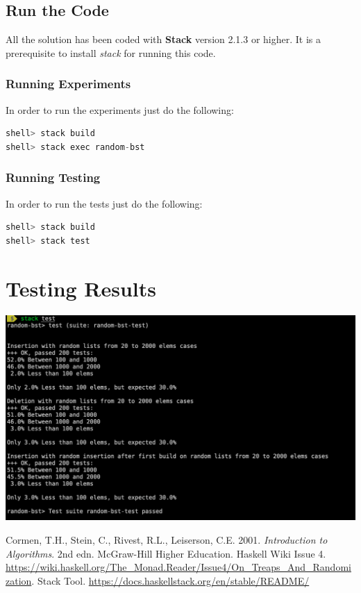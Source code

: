 \documentclass[12pt, a4paper]{article}
\begin{document}
\subsection{Run the Code}
All the solution has been coded with \textbf{Stack} \cite{stack} version 2.1.3 or higher. It is a prerequisite to install \textit{stack} for running this code.

\subsubsection{Running Experiments}

In order to run the experiments just do the following:

\begin{lstlisting}[language=Haskell,title={Running Experiments}]
shell> stack build
shell> stack exec random-bst
\end{lstlisting}


\subsubsection{Running Testing}

In order to run the tests just do the following:

\begin{lstlisting}[language=Haskell,title={Running Experiments}]
shell> stack build
shell> stack test
\end{lstlisting}

\section{Testing Results}


  \begin{minipage}[t]{\linewidth}
    \includegraphics[width=\textwidth]{tests}
    \label{fig:test_result}
  \end{minipage}


\printglossary[type=\acronymtype]

\begin{thebibliography}{9}
  Cormen, T.H., Stein, C., Rivest, R.L., Leiserson, C.E. 2001. \textit{Introduction to Algorithms}. 2nd edn. McGraw-Hill Higher Education.
  Haskell Wiki Issue 4. \url{https://wiki.haskell.org/The_Monad.Reader/Issue4/On_Treaps_And_Randomization}.
  Stack Tool. \url{https://docs.haskellstack.org/en/stable/README/}
\end{thebibliography}
\end{document}
